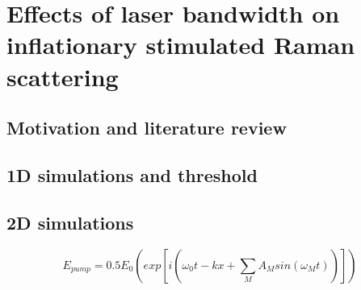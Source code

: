 \chapter{Effects of laser bandwidth on inflationary stimulated Raman scattering}
\label{chp:broadbandSRS}

\section{Motivation and literature review}
\section{1D simulations and threshold}
\section{2D simulations}
    $$E_{pump} = 0.5E_0\left(exp[i(\omega_0t-kx+\sum_MA_Msin(\omega_Mt))]\right)$$

